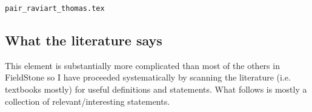 \begin{flushright} {\tiny {\color{gray} \tt pair\_raviart\_thomas.tex}} \end{flushright}

\subsection{What the literature says}

This element is substantially more complicated than most of the others
in FieldStone so I have proceeded systematically by 
scanning the literature (i.e. textbooks mostly) for 
useful definitions and statements. What follows is mostly a collection
of relevant/interesting statements.  



